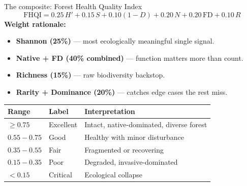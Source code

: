 \documentclass[aspectratio=169]{beamer}
\begin{document}
\begin{frame}{The composite: Forest Health Quality Index}
  \[
    \boxed{\;\text{FHQI} = 0.25\,H' + 0.15\,S + 0.10(1-D) + 0.20\,N + 0.20\,\text{FD} + 0.10\,R\;}
  \]
  \vspace{0.4em}
  \small
  \textbf{Weight rationale:}
  \begin{itemize}
    \item \textbf{Shannon (25\%)} --- most ecologically meaningful single signal.
    \item \textbf{Native + FD (40\% combined)} --- function matters more than count.
    \item \textbf{Richness (15\%)} --- raw biodiversity backstop.
    \item \textbf{Rarity + Dominance (20\%)} --- catches edge cases the rest miss.
  \end{itemize}
  \vspace{0.4em}
  \begin{center}
  \footnotesize
  \begin{tabular}{lll}
    \toprule
    Range & Label & Interpretation \\
    \midrule
    $\geq 0.75$       & Excellent & Intact, native-dominated, diverse forest \\
    $0.55 - 0.75$ & Good      & Healthy with minor disturbance \\
    $0.35 - 0.55$ & Fair      & Fragmented or recovering \\
    $0.15 - 0.35$ & Poor      & Degraded, invasive-dominated \\
    $< 0.15$        & Critical  & Ecological collapse \\
    \bottomrule
  \end{tabular}
  \end{center}
\end{frame}
\end{document}
